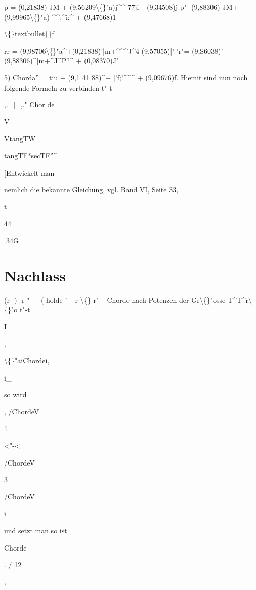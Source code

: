 \documentclass[10pt,a4paper]{article}
\begin{document}
p = (0,21838) JM + (9,56209\textbackslash\{\}"a)j\textasciicircum{}\textasciicircum{}-77ji-+(9,34508)j
p"- (9,88306) JM+(9,99965\textbackslash\{\}"a)-\textasciicircum{}\textasciicircum{}:\textasciicircum{}i:\textasciicircum{} + (9,47668)1

\textbackslash\{\}textbullet\{\}f

rr = (9,98706\textbackslash\{\}"a\textasciicircum{}+(0,21838)'|m+\textasciicircum{}\textasciicircum{}\textasciicircum{}J\textasciicircum{}4-(9,57055)|'
'r"= (9,S6038)' + (9,88306)\textasciicircum{}|m+\textasciicircum{}J\textasciicircum{}P?\textasciicircum{} + (0,08370)J'

5) Chorda'' = tiu + (9,1 41 88)\textasciicircum{}+ |'f;!\textasciicircum{}\textasciicircum{}\textasciicircum{} + (9,09676)f.
Hiemit sind nun noch folgende Formeln zu verbinden
t"-t

,.\_[\_,."
Chor de

V

VtangTW

tangTF*secTF''\textasciicircum{}

[Entwickelt man

nemlich die bekannte Gleichung, vgl. Band VI, Seite 33,

t.

44

\newpage
34G

\section*{Nachlass}

(r -)- r " -|- ( holde ' -- r-\textbackslash\{\}-r" -- Chorde
nach Potenzen der Gr\textbackslash\{\}"osse T\textasciicircum{}T\textasciicircum{}r\textbackslash\{\}"o
t"-t

I

,

\textbackslash\{\}"aiChordei,

i\_

so wird

, /ChordeV

1

<"-<

/ChordeV

3

/ChordeV

i

und setzt man
so ist

Chorde

. / 12

,
\end{document}
